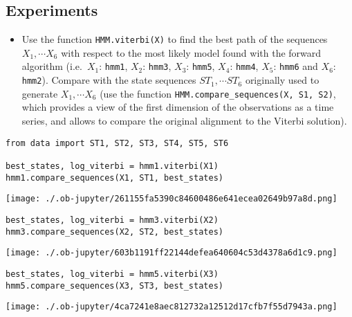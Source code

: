 \documentclass[11pt]{article}
\begin{document}
\subsection{Experiments}
\label{sec:org605936f}
\begin{itemize}
\item Use the function \texttt{HMM.viterbi(X)} to find the best path of the
sequences \(X_1, \cdots X_6\) with respect to the most likely model
found with the forward algorithm (i.e. \(X_1\): \texttt{hmm1}, \(X_2\): \texttt{hmm3}, \(X_3\): \texttt{hmm5},
\(X_4\): \texttt{hmm4}, \(X_5\): \texttt{hmm6} and \(X_6\): \texttt{hmm2}). Compare with the
state sequences \(ST_1, \cdots ST_6\) originally used to generate
\(X_1, \cdots X_6\) (use the function
\texttt{HMM.compare\_sequences(X, S1, S2)}, which provides a view of the first
dimension of the observations as a time series, and allows to compare
the original alignment to the Viterbi solution).
\end{itemize}

\begin{verbatim}
from data import ST1, ST2, ST3, ST4, ST5, ST6

best_states, log_viterbi = hmm1.viterbi(X1)
hmm1.compare_sequences(X1, ST1, best_states)
\end{verbatim}

\begin{center}
\texttt{[image: ./.ob-jupyter/261155fa5390c84600486e641ecea02649b97a8d.png]}
\end{center}

\begin{verbatim}
best_states, log_viterbi = hmm3.viterbi(X2)
hmm3.compare_sequences(X2, ST2, best_states)
\end{verbatim}

\begin{center}
\texttt{[image: ./.ob-jupyter/603b1191ff22144defea640604c53d4378a6d1c9.png]}
\end{center}

\begin{verbatim}
best_states, log_viterbi = hmm5.viterbi(X3)
hmm5.compare_sequences(X3, ST3, best_states)
\end{verbatim}

\begin{center}
\texttt{[image: ./.ob-jupyter/4ca7241e8aec812732a12512d17cfb7f55d7943a.png]}
\end{center}
\end{document}
